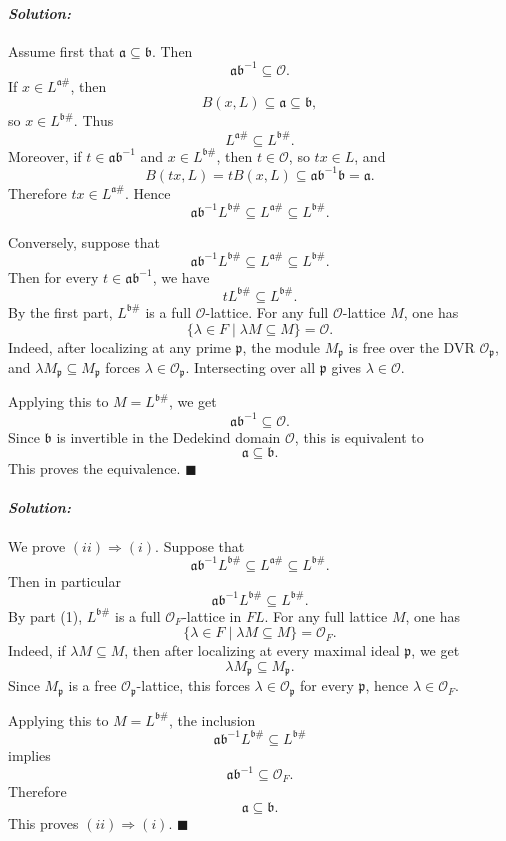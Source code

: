 \documentclass[12pt, a4paper]{article}
\newenvironment{solution}
  {\paragraph{\textit{Solution:}}\par\medskip}
  {\hfill$\blacksquare$\vspace{0.1cm}}
\begin{document}
\begin{solution}
Assume first that \(\mathfrak a\subseteq \mathfrak b\). Then
\[
\mathfrak a\mathfrak b^{-1}\subseteq \mathcal O.
\]
If \(x\in L^{\mathfrak a\#}\), then
\[
B(x,L)\subseteq \mathfrak a\subseteq \mathfrak b,
\]
so \(x\in L^{\mathfrak b\#}\). Thus
\[
L^{\mathfrak a\#}\subseteq L^{\mathfrak b\#}.
\]
Moreover, if \(t\in \mathfrak a\mathfrak b^{-1}\) and
\(x\in L^{\mathfrak b\#}\), then \(t\in\mathcal O\), so \(tx\in L\), and
\[
B(tx,L)=tB(x,L)\subseteq
\mathfrak a\mathfrak b^{-1}\mathfrak b
=
\mathfrak a.
\]
Therefore \(tx\in L^{\mathfrak a\#}\). Hence
\[
\mathfrak a\mathfrak b^{-1}L^{\mathfrak b\#}
\subseteq
L^{\mathfrak a\#}
\subseteq
L^{\mathfrak b\#}.
\]

Conversely, suppose that
\[
\mathfrak a\mathfrak b^{-1}L^{\mathfrak b\#}
\subseteq
L^{\mathfrak a\#}
\subseteq
L^{\mathfrak b\#}.
\]
Then for every \(t\in \mathfrak a\mathfrak b^{-1}\), we have
\[
tL^{\mathfrak b\#}\subseteq L^{\mathfrak b\#}.
\]
By the first part, \(L^{\mathfrak b\#}\) is a full \(\mathcal O\)-lattice.
For any full \(\mathcal O\)-lattice \(M\), one has
\[
\{\lambda\in F\mid \lambda M\subseteq M\}=\mathcal O.
\]
Indeed, after localizing at any prime \(\mathfrak p\), the module
\(M_{\mathfrak p}\) is free over the DVR \(\mathcal O_{\mathfrak p}\), and
\(\lambda M_{\mathfrak p}\subseteq M_{\mathfrak p}\) forces
\(\lambda\in\mathcal O_{\mathfrak p}\). Intersecting over all
\(\mathfrak p\) gives \(\lambda\in\mathcal O\).

Applying this to \(M=L^{\mathfrak b\#}\), we get
\[
\mathfrak a\mathfrak b^{-1}\subseteq \mathcal O.
\]
Since \(\mathfrak b\) is invertible in the Dedekind domain \(\mathcal O\), this
is equivalent to
\[
\mathfrak a\subseteq \mathfrak b.
\]
This proves the equivalence.
\end{solution}
\begin{solution}
We prove \((ii)\Rightarrow (i)\). Suppose that
\[
\mathfrak a\mathfrak b^{-1}L^{\mathfrak b\#}
\subseteq
L^{\mathfrak a\#}
\subseteq
L^{\mathfrak b\#}.
\]
Then in particular
\[
\mathfrak a\mathfrak b^{-1}L^{\mathfrak b\#}
\subseteq
L^{\mathfrak b\#}.
\]
By part (1), \(L^{\mathfrak b\#}\) is a full \(\mathcal O_F\)-lattice in
\(FL\). For any full lattice \(M\), one has
\[
\{\lambda\in F\mid \lambda M\subseteq M\}=\mathcal O_F.
\]
Indeed, if \(\lambda M\subseteq M\), then after localizing at every maximal
ideal \(\mathfrak p\), we get
\[
\lambda M_{\mathfrak p}\subseteq M_{\mathfrak p}.
\]
Since \(M_{\mathfrak p}\) is a free \(\mathcal O_{\mathfrak p}\)-lattice, this
forces \(\lambda\in\mathcal O_{\mathfrak p}\) for every \(\mathfrak p\), hence
\(\lambda\in\mathcal O_F\).

Applying this to \(M=L^{\mathfrak b\#}\), the inclusion
\[
\mathfrak a\mathfrak b^{-1}L^{\mathfrak b\#}
\subseteq
L^{\mathfrak b\#}
\]
implies
\[
\mathfrak a\mathfrak b^{-1}\subseteq \mathcal O_F.
\]
Therefore
\[
\mathfrak a\subseteq \mathfrak b.
\]
This proves \((ii)\Rightarrow(i)\).
\end{solution}
\end{document}
